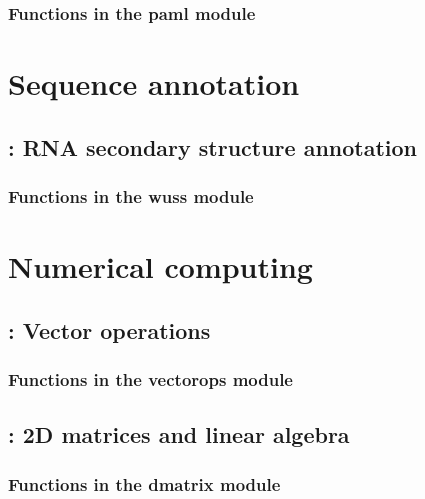 \documentclass[10pt]{book}
\begin{document}
\subsection{Functions in the paml module}



\chapter{Sequence annotation}

\newpage
\section{: RNA secondary structure annotation}

\subsection{Functions in the wuss module}



\chapter{Numerical computing}

\newpage
\section{: Vector operations}

\subsection{Functions in the vectorops module}


\newpage
\section{: 2D matrices and linear algebra}

\subsection{Functions in the dmatrix module}


\newpage
\end{document}

